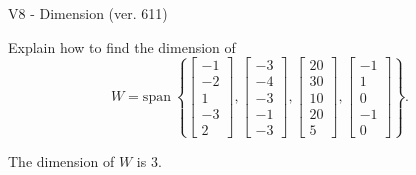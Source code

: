 \begin{exercise}
  \begin{exerciseTitle}V8 - Dimension (ver. 611)\end{exerciseTitle}
  \begin{exerciseStatement}
    Explain how to find the dimension of 
\[W=\mathrm{span}\ \left\{\left[\begin{array}{r}
-1 \\
-2 \\
1 \\
-3 \\
2
\end{array}\right] , \left[\begin{array}{r}
-3 \\
-4 \\
-3 \\
-1 \\
-3
\end{array}\right] , \left[\begin{array}{r}
20 \\
30 \\
10 \\
20 \\
5
\end{array}\right] , \left[\begin{array}{r}
-1 \\
1 \\
0 \\
-1 \\
0
\end{array}\right]\right\}.\]



  \end{exerciseStatement}
  \begin{exerciseAnswer}
   The dimension of \(W\) is  \(3\).
  


  \end{exerciseAnswer}
\end{exercise}